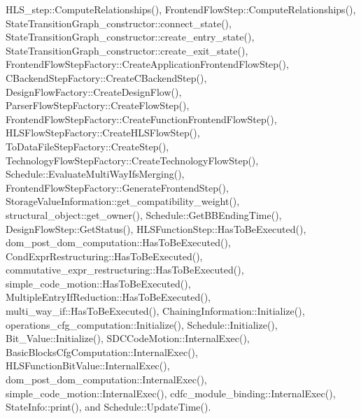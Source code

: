 H\+L\+S\+\_\+step\+::\+Compute\+Relationships(), Frontend\+Flow\+Step\+::\+Compute\+Relationships(), State\+Transition\+Graph\+\_\+constructor\+::connect\+\_\+state(), State\+Transition\+Graph\+\_\+constructor\+::create\+\_\+entry\+\_\+state(), State\+Transition\+Graph\+\_\+constructor\+::create\+\_\+exit\+\_\+state(), Frontend\+Flow\+Step\+Factory\+::\+Create\+Application\+Frontend\+Flow\+Step(), C\+Backend\+Step\+Factory\+::\+Create\+C\+Backend\+Step(), Design\+Flow\+Factory\+::\+Create\+Design\+Flow(), Parser\+Flow\+Step\+Factory\+::\+Create\+Flow\+Step(), Frontend\+Flow\+Step\+Factory\+::\+Create\+Function\+Frontend\+Flow\+Step(), H\+L\+S\+Flow\+Step\+Factory\+::\+Create\+H\+L\+S\+Flow\+Step(), To\+Data\+File\+Step\+Factory\+::\+Create\+Step(), Technology\+Flow\+Step\+Factory\+::\+Create\+Technology\+Flow\+Step(), Schedule\+::\+Evaluate\+Multi\+Way\+Ifs\+Merging(), Frontend\+Flow\+Step\+Factory\+::\+Generate\+Frontend\+Step(), Storage\+Value\+Information\+::get\+\_\+compatibility\+\_\+weight(), structural\+\_\+object\+::get\+\_\+owner(), Schedule\+::\+Get\+B\+B\+Ending\+Time(), Design\+Flow\+Step\+::\+Get\+Status(), H\+L\+S\+Function\+Step\+::\+Has\+To\+Be\+Executed(), dom\+\_\+post\+\_\+dom\+\_\+computation\+::\+Has\+To\+Be\+Executed(), Cond\+Expr\+Restructuring\+::\+Has\+To\+Be\+Executed(), commutative\+\_\+expr\+\_\+restructuring\+::\+Has\+To\+Be\+Executed(), simple\+\_\+code\+\_\+motion\+::\+Has\+To\+Be\+Executed(), Multiple\+Entry\+If\+Reduction\+::\+Has\+To\+Be\+Executed(), multi\+\_\+way\+\_\+if\+::\+Has\+To\+Be\+Executed(), Chaining\+Information\+::\+Initialize(), operations\+\_\+cfg\+\_\+computation\+::\+Initialize(), Schedule\+::\+Initialize(), Bit\+\_\+\+Value\+::\+Initialize(), S\+D\+C\+Code\+Motion\+::\+Internal\+Exec(), Basic\+Blocks\+Cfg\+Computation\+::\+Internal\+Exec(), H\+L\+S\+Function\+Bit\+Value\+::\+Internal\+Exec(), dom\+\_\+post\+\_\+dom\+\_\+computation\+::\+Internal\+Exec(), simple\+\_\+code\+\_\+motion\+::\+Internal\+Exec(), cdfc\+\_\+module\+\_\+binding\+::\+Internal\+Exec(), State\+Info\+::print(), and Schedule\+::\+Update\+Time().

